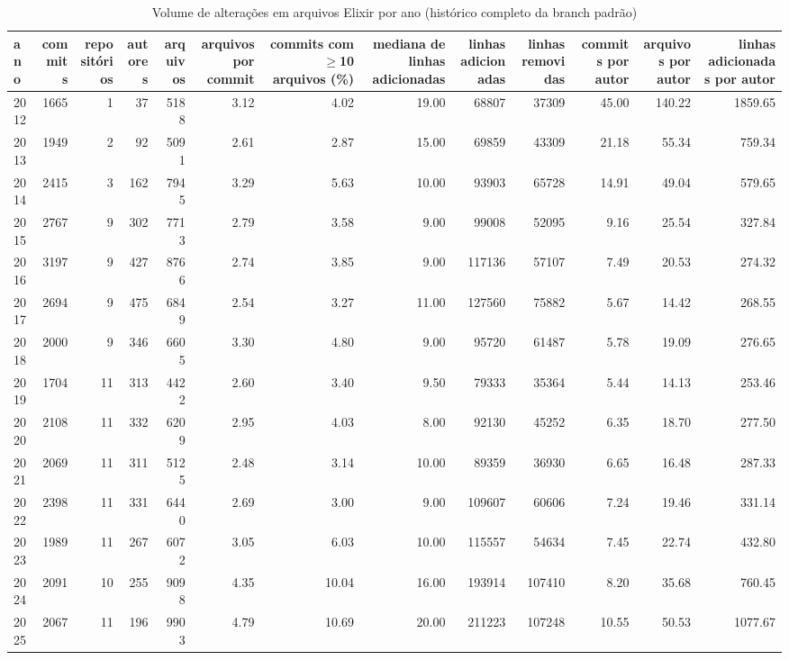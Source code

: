 \begin{table}[htbp]
\centering
\caption{Volume de alterações em arquivos Elixir por ano (histórico completo da branch padrão)}
\label{tab:volume}
\begin{tabular}{lrrrrrrrrrrrr}
\toprule
ano & commits & repositórios & autores & arquivos & arquivos por commit & commits com $\geq$10 arquivos (\%) & mediana de linhas adicionadas & linhas adicionadas & linhas removidas & commits por autor & arquivos por autor & linhas adicionadas por autor \\
\midrule
2012 & 1665 & 1 & 37 & 5188 & 3.12 & 4.02 & 19.00 & 68807 & 37309 & 45.00 & 140.22 & 1859.65 \\
2013 & 1949 & 2 & 92 & 5091 & 2.61 & 2.87 & 15.00 & 69859 & 43309 & 21.18 & 55.34 & 759.34 \\
2014 & 2415 & 3 & 162 & 7945 & 3.29 & 5.63 & 10.00 & 93903 & 65728 & 14.91 & 49.04 & 579.65 \\
2015 & 2767 & 9 & 302 & 7713 & 2.79 & 3.58 & 9.00 & 99008 & 52095 & 9.16 & 25.54 & 327.84 \\
2016 & 3197 & 9 & 427 & 8766 & 2.74 & 3.85 & 9.00 & 117136 & 57107 & 7.49 & 20.53 & 274.32 \\
2017 & 2694 & 9 & 475 & 6849 & 2.54 & 3.27 & 11.00 & 127560 & 75882 & 5.67 & 14.42 & 268.55 \\
2018 & 2000 & 9 & 346 & 6605 & 3.30 & 4.80 & 9.00 & 95720 & 61487 & 5.78 & 19.09 & 276.65 \\
2019 & 1704 & 11 & 313 & 4422 & 2.60 & 3.40 & 9.50 & 79333 & 35364 & 5.44 & 14.13 & 253.46 \\
2020 & 2108 & 11 & 332 & 6209 & 2.95 & 4.03 & 8.00 & 92130 & 45252 & 6.35 & 18.70 & 277.50 \\
2021 & 2069 & 11 & 311 & 5125 & 2.48 & 3.14 & 10.00 & 89359 & 36930 & 6.65 & 16.48 & 287.33 \\
2022 & 2398 & 11 & 331 & 6440 & 2.69 & 3.00 & 9.00 & 109607 & 60606 & 7.24 & 19.46 & 331.14 \\
2023 & 1989 & 11 & 267 & 6072 & 3.05 & 6.03 & 10.00 & 115557 & 54634 & 7.45 & 22.74 & 432.80 \\
2024 & 2091 & 10 & 255 & 9098 & 4.35 & 10.04 & 16.00 & 193914 & 107410 & 8.20 & 35.68 & 760.45 \\
2025 & 2067 & 11 & 196 & 9903 & 4.79 & 10.69 & 20.00 & 211223 & 107248 & 10.55 & 50.53 & 1077.67 \\
\bottomrule
\end{tabular}
\end{table}
